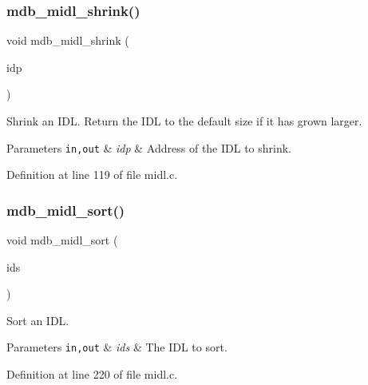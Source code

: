 \subsubsection{\texorpdfstring{mdb\+\_\+midl\+\_\+shrink()}{mdb\_midl\_shrink()}}
{\footnotesize\ttfamily void mdb\+\_\+midl\+\_\+shrink (\begin{DoxyParamCaption}\item[{\mbox{\hyperlink{group__idls_ga238cc39c422225e05cb3897e641ca9e5}{M\+D\+B\+\_\+\+I\+DL}} $\ast$}]{idp }\end{DoxyParamCaption})}

Shrink an I\+DL. Return the I\+DL to the default size if it has grown larger. 
\begin{DoxyParams}[1]{Parameters}
\mbox{\tt in,out}  & {\em idp} & Address of the I\+DL to shrink. \\
\hline
\end{DoxyParams}


Definition at line 119 of file midl.\+c.

\mbox{\label{group__idls_gac3fe60f3087a5fdba4908f53a62d16d5}} 
\subsubsection{\texorpdfstring{mdb\+\_\+midl\+\_\+sort()}{mdb\_midl\_sort()}}
{\footnotesize\ttfamily void mdb\+\_\+midl\+\_\+sort (\begin{DoxyParamCaption}\item[{\mbox{\hyperlink{group__idls_ga238cc39c422225e05cb3897e641ca9e5}{M\+D\+B\+\_\+\+I\+DL}}}]{ids }\end{DoxyParamCaption})}

Sort an I\+DL. 
\begin{DoxyParams}[1]{Parameters}
\mbox{\tt in,out}  & {\em ids} & The I\+DL to sort. \\
\hline
\end{DoxyParams}


Definition at line 220 of file midl.\+c.

\mbox{\label{group__idls_ga35e6813874447861b772f4089ce9fa70}} 
